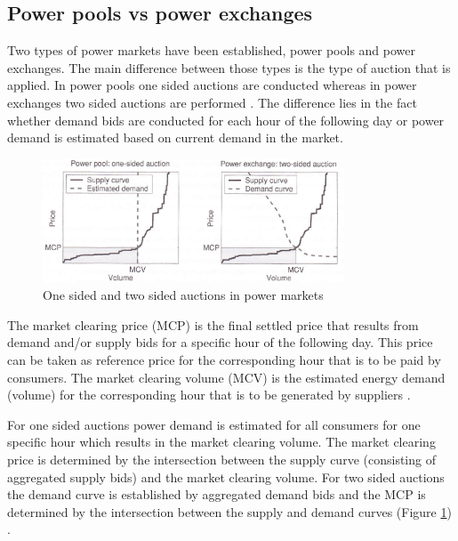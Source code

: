 \subsection{Power pools vs power exchanges}

Two types of power markets have been established, power pools and power exchanges. The main difference between those types is the type of auction that is applied. In power pools one sided auctions are conducted whereas in power exchanges two sided auctions are performed \cite{weron2007modeling}. The difference lies in the fact whether demand bids are conducted for each hour of the following day or power demand is estimated based on current demand in the market. 

\begin{figure}[htbp]
	\centering
		\includegraphics[width=0.8\textwidth]{figures/data_analysis/power_markets_one_two_sided_auctions.PNG}
	\caption{One sided and two sided auctions in power markets \cite{weron2007modeling}}
	\label{fig:power_markets_one_two_sided_auctions}
\end{figure}

The market clearing price (MCP) is the final settled price that results from demand and/or supply bids for a specific hour of the following day. This price can be taken as reference price for the corresponding hour that is to be paid by consumers. The market clearing volume (MCV) is the estimated energy demand (volume) for the corresponding hour that is to be generated by suppliers \cite{weron2007modeling}. 

For one sided auctions power demand is estimated for all consumers for one specific hour which results in the market clearing volume. The market clearing price is determined by the intersection between the supply curve (consisting of aggregated supply bids) and the market clearing volume. 
For two sided auctions the demand curve is established by aggregated demand bids and the MCP is determined by the intersection between the supply and demand curves (Figure \ref{fig:power_markets_one_two_sided_auctions}) \cite{weron2007modeling}. 

